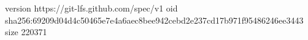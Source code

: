 version https://git-lfs.github.com/spec/v1
oid sha256:69209d04d4c50465e7e4a6aec8bee942cebd2e237cd17b971f95486246ee3443
size 220371
